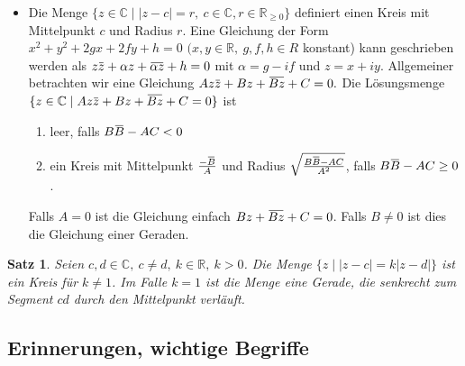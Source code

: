 \documentclass[a4paper,12pt]{article}
\theoremstyle{newthm}
\newtheorem{thm}{Satz}[subsection]
\theoremstyle{newdef}
\theoremstyle{newrem}
\newcommand{\R}{\mathbb{R}}
\newcommand{\C}{\mathbb{C}}
\newcommand{\overbar}[1]{\mkern 1.5mu\overline{\mkern-1.5mu#1\mkern-1.5mu}\mkern 1.5mu}
\begin{document}
\begin{itemize}
			\item Die Menge $ \{z \in \C \mid |z-c| = r,\ c \in \C, r \in \R_{\geq 0}\} $ definiert einen Kreis mit Mittelpunkt $c$ und Radius $r$. Eine Gleichung der Form $ x^2 + y^2 + 2gx + 2fy + h = 0 $ $ (x,y \in \R,\ g,f,h \in R $ konstant) kann geschrieben werden als $ z \overbar{z} + \alpha z + \overbar{\alpha z} + h=0 $ mit $ \alpha = g-if $ und $ z = x+iy $. Allgemeiner betrachten wir eine Gleichung $ Az\overbar{z} + Bz + \overbar{Bz} + C = 0. $ Die Lösungsmenge $ \{ z \in \C \mid Az\overbar{z} + Bz + \overbar{Bz} + C = 0 \} $ ist
			\begin{enumerate}[label={\roman*})]
				\item leer, falls $ B\overbar{B} - AC < 0 $
				\item ein Kreis mit Mittelpunkt $ \frac{-\overbar{B}}{A} $ und Radius $ \sqrt{\frac{B \overbar{B} - AC}{A^2}} $, falls $ B\overbar{B} - AC \geq 0 $.
			\end{enumerate}
			Falls $A=0$ ist die Gleichung einfach $ Bz + \overbar{Bz} + C = 0 $. Falls $ B \neq 0 $ ist dies die Gleichung einer Geraden.
		\end{itemize}
		
		\begin{thm}
			Seien $ c,d \in \C,\ c \neq d,\ k \in \R,\ k > 0 $. Die Menge $ \{ z \mid |z-c| = k|z-d| \} $ ist ein Kreis für $ k \neq 1 $. Im Falle $ k = 1 $ ist die Menge eine Gerade, die senkrecht zum Segment $ cd $ durch den Mittelpunkt verläuft.
		\end{thm}
		
	
	\subsection{Erinnerungen, wichtige Begriffe}
		
\end{document}
